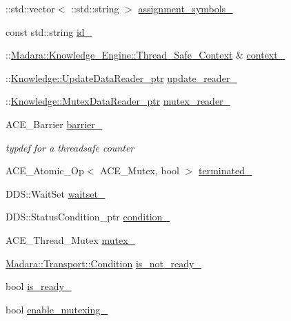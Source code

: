 \begin{DoxyCompactItemize}
\item 
::std::vector$<$ ::std::string $>$ \hyperlink{classMadara_1_1Transport_1_1Splice__Read__Thread_af941b4eb602832b645701c42d42f5e50}{assignment\_\-symbols\_\-}
\item 
const std::string \hyperlink{classMadara_1_1Transport_1_1Splice__Read__Thread_a2c04d64648061c72cb08113bf2d1c137}{id\_\-}
\item 
::\hyperlink{classMadara_1_1Knowledge__Engine_1_1Thread__Safe__Context}{Madara::Knowledge\_\-Engine::Thread\_\-Safe\_\-Context} \& \hyperlink{classMadara_1_1Transport_1_1Splice__Read__Thread_a899ad85e073aacfdb1d9000b39ff5960}{context\_\-}
\item 
::\hyperlink{classKnowledge_1_1UpdateDataReader}{Knowledge::UpdateDataReader\_\-ptr} \hyperlink{classMadara_1_1Transport_1_1Splice__Read__Thread_a46dffcab5a39bda92f4783705bb893bd}{update\_\-reader\_\-}
\item 
::\hyperlink{classKnowledge_1_1MutexDataReader}{Knowledge::MutexDataReader\_\-ptr} \hyperlink{classMadara_1_1Transport_1_1Splice__Read__Thread_a6ce0b58da3928412036a1b3e070a55b8}{mutex\_\-reader\_\-}
\item 
ACE\_\-Barrier \hyperlink{classMadara_1_1Transport_1_1Splice__Read__Thread_a1ac9be82d884c2366923bd5f95d6b3c8}{barrier\_\-}
\begin{DoxyCompactList}\small\item\em typdef for a threadsafe counter \item\end{DoxyCompactList}\item 
ACE\_\-Atomic\_\-Op$<$ ACE\_\-Mutex, bool $>$ \hyperlink{classMadara_1_1Transport_1_1Splice__Read__Thread_a5cafe35dd52b080cce126ee746c79033}{terminated\_\-}
\item 
DDS::WaitSet \hyperlink{classMadara_1_1Transport_1_1Splice__Read__Thread_a768b5b0cfa08c3e499a9d5075052457d}{waitset\_\-}
\item 
DDS::StatusCondition\_\-ptr \hyperlink{classMadara_1_1Transport_1_1Splice__Read__Thread_a8dabbe08768a63ad0b8625d4ebbabe06}{condition\_\-}
\item 
ACE\_\-Thread\_\-Mutex \hyperlink{classMadara_1_1Transport_1_1Splice__Read__Thread_a9c431adb377e9c87e7461e3f74dd57bb}{mutex\_\-}
\item 
\hyperlink{namespaceMadara_1_1Transport_a5dd6d9a7fb47cdbf2d1448242da4e13d}{Madara::Transport::Condition} \hyperlink{classMadara_1_1Transport_1_1Splice__Read__Thread_af7a39070fa9019143d7971022c08be4a}{is\_\-not\_\-ready\_\-}
\item 
bool \hyperlink{classMadara_1_1Transport_1_1Splice__Read__Thread_a696974cc3cc3ff803f65a3e0b00038dc}{is\_\-ready\_\-}
\item 
bool \hyperlink{classMadara_1_1Transport_1_1Splice__Read__Thread_ab8595b5547734b537d0cefa26a660777}{enable\_\-mutexing\_\-}
\end{DoxyCompactItemize}


